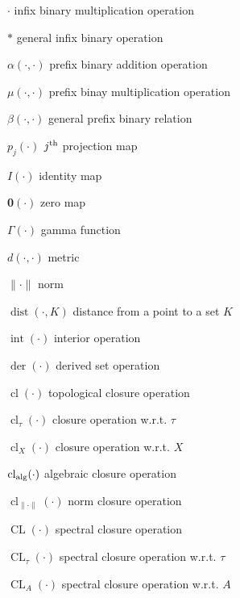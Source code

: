 \documentclass[12pt, oneside]{book}
\def\inter{\operatorname{int}}
\def\cl{\operatorname{cl}}
\def\CL{\operatorname{CL}}
\def\der{\operatorname{der}}
\def\dist{\operatorname{dist}}
\begin{document}
\begin{changemargin}{-2cm}{-2cm}
\begin{minipage}[t]{0.6\textwidth}
$\cdot$ \hfill infix binary multiplication operation\

\medskip

$*$ \hfill general infix binary operation\

\medskip

$\alpha(\cdot,\cdot)$ \hfill prefix binary addition operation\

\medskip

$\mu(\cdot, \cdot)$ \hfill prefix binay multiplication operation\

\medskip

$\beta(\cdot, \cdot)$ \hfill general prefix binary relation\

\medskip

$p_j(\cdot)$ \hfill $j^{\textup{th}}$ projection map\

\medskip

$I(\cdot)$ \hfill identity map\

\medskip

\textbf{0}$(\cdot)$ \hfill zero map\

\medskip

$\Gamma(\cdot)$ \hfill gamma function\

\medskip

$d(\cdot, \cdot)$ \hfill metric\

\medskip

$\| \cdot \|$ \hfill norm\

\medskip

$\dist(\cdot,K)$ \hfill distance from a point to a set $K$\

\medskip

$\inter(\cdot)$ \hfill interior operation\

\medskip

$\der(\cdot)$ \hfill derived set operation\

\medskip

$\cl(\cdot)$ \hfill topological closure operation\

\medskip

$\cl_{\tau}(\cdot)$ \hfill closure operation w.r.t. $\tau$\

\medskip 

$\cl_X(\cdot)$ \hfill closure operation w.r.t. $X$\

\medskip

$\cl_{\textup{alg}}(\cdot)$ \hfill algebraic closure operation\

\medskip

$\cl_{\| \cdot \|}(\cdot)$ \hfill norm closure operation\

\medskip

$\CL(\cdot)$ \hfill spectral closure operation\

\medskip

$\CL_{\tau}(\cdot)$ \hfill spectral closure operation w.r.t. $\tau$\

\medskip

$\CL_A(\cdot)$ \hfill spectral closure operation w.r.t. $A$\


\end{minipage}


\end{changemargin}
\end{document}
